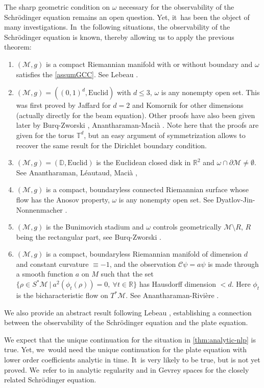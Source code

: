 \documentclass[JEP,XML,SOM,Unicode,published]{cedram}
\theoremstyle{definition}
\let\mc\mathcal
\newcommand{\M}{\mc{M}}
\newcommand{\R}{\mathbb{R}}
\begin{document}
The sharp geometric condition on $\omega$ necessary for the observability of the Schrödinger equation remains an open question. Yet, it~has been the object of many investigations. In~the following situations, the observability of the Schrödinger equation is known, thereby allowing us to apply the previous theorem:
\begin{enumerate}
\item $(\M, g)$ is a compact Riemannian manifold with or without boundary and $\omega$ satisfies the \ref{assumGCC}. See Lebeau \cite{Leb92}.
\item $(\M,g)=((0,1)^d,\text{Euclid})$ with $d\leq 3$, $\omega$ is any nonempty open set. This was first proved by Jaffard for $d=2$ and Komornik \cite{K:92} for other dimensions (actually directly for the beam equation). Other proofs have also been given later by Burq-Zworski \cite{BZ:04}, Anantharaman-Macià \cite{AM:14}. Note here that the proofs are given for the torus $\mathbb{T}^d$, but an easy argument of symmetrization allows to recover the same result for the Dirichlet boundary condition.
\item $(\M, g)=(\mathbb{D}, \text{Euclid})$ is the Euclidean closed disk in $\R^2$ and $\omega\cap \partial \M\neq\emptyset$. See Anantharaman, Léautaud, Macià \cite[Th.\,1.2]{2016:anantharaman-leautaud-macia:wigner-schrodinger-disk},
\item $(\M, g)$ is a compact, boundaryless connected Riemannian surface whose flow has the Anosov property, $\omega$ is any nonempty open set. See Dyatlov-Jin-Nonnenmacher \cite[Th.\,5]{DJN:22}.
\item $(\M, g)$ is the Bunimovich stadium and $\omega$ controls geometrically $\M\setminus R$, $R$ being the rectangular part, see Burq-Zworski \cite[Th.\,9]{BZ:04}.
\item $(\M, g)$ is a compact, boundaryless Riemannian manifold of dimension $d$ and constant curvature $\equiv -1$, and the observation $\mc{C}\psi= a\psi$ is made through a smooth function $a$ on $M$ such that the set
$\{\rho\in S^*\M\ |\ a^2(\phi_t(\rho))=0,\ \forall t\in \R\}$
has Hausdorff dimension $<d$. Here $\phi_t$ is the bicharacteristic flow on $T^*\M$. See Anantharaman-Rivi\`ere \cite[Th.\,2.5]{AR:12}.
\end{enumerate}
We also provide an abstract result following Lebeau \cite{Leb92}, establishing a connection between the observability of the Schrödinger equation and the plate equation.

We expect that the unique continuation for the situation in \cref{thm:analytic-nlp} is true. Yet, we~would need the unique continuation for the plate equation with lower order coefficients analytic in time. It~is very likely to be true, but is not yet proved. We~refer to \cite{Tat99,RZ:98,Hor:97} in analytic regularity and \cite{FLL25} in Gevrey spaces for the closely related Schrödinger equation.
\end{document}
